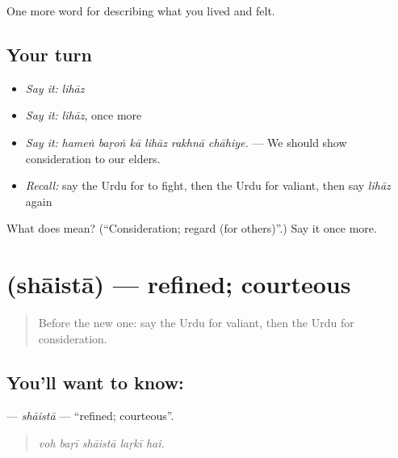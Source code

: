 \begin{grammarlens}[title={What you've built}]
One more word for describing what you lived and felt.
\end{grammarlens}

\subsection*{Your turn}
\begin{itemize}
\raggedright
  \item \emph{Say it:} \emph{lihāz}
  \item \emph{Say it:} \emph{lihāz}, once more
  \item \emph{Say it:} \emph{hameṅ baṛoṅ kā lihāz rakhnā chāhiye.} — We should show consideration to our elders.
  \item \emph{Recall:} say the Urdu for to fight, then the Urdu for valiant, then say \emph{lihāz} again
\end{itemize}

\begin{tcolorbox}[breakable,colback=teal!4,colframe=teal!35!black,title={Before you move on}]
What does  mean? (\textquotedblleft{}Consideration; regard (for others)\textquotedblright{}.) Say it once more.
\end{tcolorbox}
\section[\texorpdfstring{\ur{شائستہ} (shāistā)}{شائستہ (shāistā)}]{ (shāistā) — refined; courteous}

\label{lesson:UR-C461-shaista}



\begin{quote}
Before the new one: say the Urdu for valiant, then the Urdu for consideration.
\end{quote}

\subsection*{You'll want to know: }
\textbf{} — \emph{shāistā} — \textquotedblleft{}refined; courteous\textquotedblright{}.

\begin{quote}
    
\end{quote}

\begin{quote}
\emph{voh baṛī shāistā laṛkī hai.}
\end{quote}

